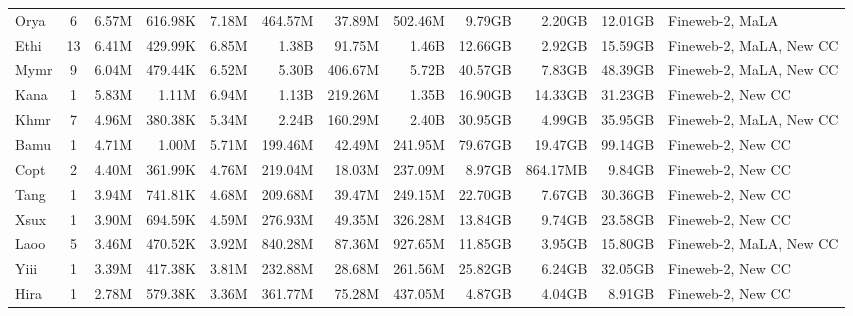 \begin{table*}[!htp]
{\begin{tabular}{l|c|rrr|rrr|rrr|l}
Orya                    & 6                        & 6.57M    & 616.98K  & 7.18M   & 464.57M & 37.89M  & 502.46M & 9.79GB   & 2.20GB   & 12.01GB  & Fineweb-2, MaLA                \\
Ethi                    & 13                       & 6.41M    & 429.99K  & 6.85M   & 1.38B   & 91.75M  & 1.46B   & 12.66GB  & 2.92GB   & 15.59GB  & Fineweb-2, MaLA, New CC         \\
Mymr                    & 9                        & 6.04M    & 479.44K  & 6.52M   & 5.30B   & 406.67M & 5.72B   & 40.57GB  & 7.83GB   & 48.39GB  & Fineweb-2, MaLA, New CC         \\
Kana                    & 1                        & 5.83M    & 1.11M    & 6.94M   & 1.13B   & 219.26M & 1.35B   & 16.90GB  & 14.33GB  & 31.23GB  & Fineweb-2, New CC              \\
Khmr                    & 7                        & 4.96M    & 380.38K  & 5.34M   & 2.24B   & 160.29M & 2.40B   & 30.95GB  & 4.99GB   & 35.95GB  & Fineweb-2, MaLA, New CC         \\
Bamu                    & 1                        & 4.71M    & 1.00M    & 5.71M   & 199.46M & 42.49M  & 241.95M & 79.67GB  & 19.47GB  & 99.14GB  & Fineweb-2, New CC              \\
Copt                    & 2                        & 4.40M    & 361.99K  & 4.76M   & 219.04M & 18.03M  & 237.09M & 8.97GB   & 864.17MB & 9.84GB   & Fineweb-2, New CC              \\
Tang                    & 1                        & 3.94M    & 741.81K  & 4.68M   & 209.68M & 39.47M  & 249.15M & 22.70GB  & 7.67GB   & 30.36GB  & Fineweb-2, New CC              \\
Xsux                    & 1                        & 3.90M    & 694.59K  & 4.59M   & 276.93M & 49.35M  & 326.28M & 13.84GB  & 9.74GB   & 23.58GB  & Fineweb-2, New CC              \\
Laoo                    & 5                        & 3.46M    & 470.52K  & 3.92M   & 840.28M & 87.36M  & 927.65M & 11.85GB  & 3.95GB   & 15.80GB  & Fineweb-2, MaLA, New CC         \\
Yiii                    & 1                        & 3.39M    & 417.38K  & 3.81M   & 232.88M & 28.68M  & 261.56M & 25.82GB  & 6.24GB   & 32.05GB  & Fineweb-2, New CC              \\
Hira                    & 1                        & 2.78M    & 579.38K  & 3.36M   & 361.77M & 75.28M  & 437.05M & 4.87GB   & 4.04GB   & 8.91GB   & Fineweb-2, New CC              \\

\end{tabular}}
\end{table*}
